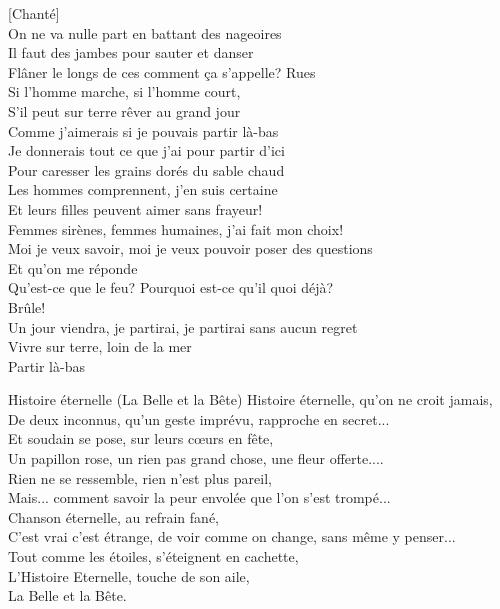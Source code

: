 \documentclass{novel}
\begin{document}
{[Chanté]} \\
On ne va nulle part en battant des nageoires \\
Il faut des jambes pour sauter et danser \\
Flâner le longs de ces comment ça s'appelle? Rues \\
Si l'homme marche, si l'homme court, \\
S'il peut sur terre rêver au grand jour \\
Comme j'aimerais si je pouvais partir là-bas \\
Je donnerais tout ce que j'ai pour partir d'ici \\
Pour caresser les grains dorés du sable chaud \\
Les hommes comprennent, j'en suis certaine \\
Et leurs filles peuvent aimer sans frayeur! \\
Femmes sirènes, femmes humaines, j'ai fait mon choix! \\
Moi je veux savoir, moi je veux pouvoir poser des questions \\
Et qu'on me réponde \\
Qu'est-ce que le feu? Pourquoi est-ce qu'il quoi déjà? \\
Brûle! \\
Un jour viendra, je partirai, je partirai sans aucun regret \\
Vivre sur terre, loin de la mer \\
Partir là-bas

\newpage
\normalsize
\h*{Histoire éternelle (La Belle et la Bête)}
Histoire éternelle, qu'on ne croit jamais, \\
De deux inconnus, qu'un geste imprévu, rapproche en secret... \\
Et soudain se pose, sur leurs cœurs en fête, \\
Un papillon rose, un rien pas grand chose, une fleur offerte.... \\

Rien ne se ressemble, rien n'est plus pareil, \\
Mais... comment savoir la peur envolée que l'on s'est trompé... \\

Chanson éternelle, au refrain fané, \\
C'est vrai c'est étrange, de voir comme on change, sans même y penser... \\

Tout comme les étoiles, s'éteignent en cachette, \\
L'Histoire Eternelle, touche de son aile, \\
La Belle et la Bête. \\
\end{document}
